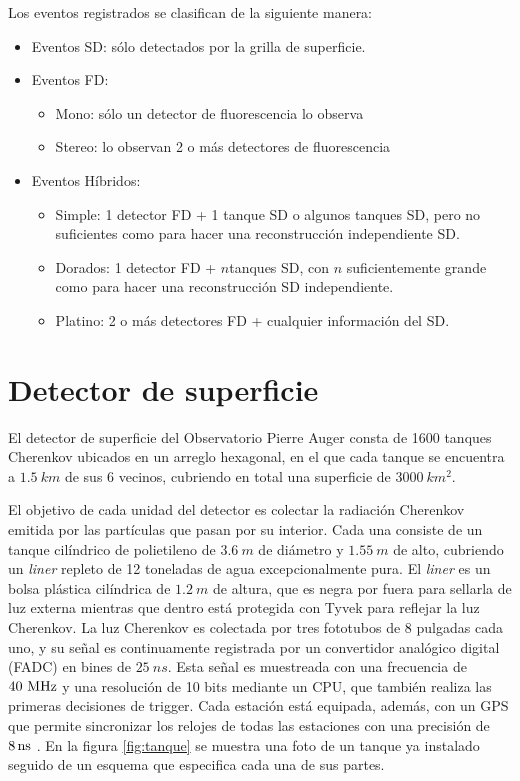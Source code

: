 	Los eventos registrados se clasifican de la siguiente manera:
	\begin{itemize}
		\item Eventos SD: s\'olo detectados por la grilla de superficie.
		\item Eventos FD:
		\begin{itemize}
			\item Mono: s\'olo un detector de fluorescencia lo observa
			\item Stereo: lo observan 2 o m\'as detectores de fluorescencia 
		\end{itemize} 
		\item Eventos H\'ibridos:
		\begin{itemize}
			\item Simple: 1 detector FD + 1 tanque SD o algunos tanques SD, pero no suficientes como para hacer una reconstrucci\'on independiente SD.
			\item Dorados: 1 detector FD + $n$tanques SD, con $n$ suficientemente grande como para hacer una reconstrucci\'on SD independiente.
			\item Platino: 2 o m\'as detectores FD + cualquier informaci\'on del SD.
		\end{itemize}
	\end{itemize}
	
	\section{Detector de superficie}
	
	El detector de superficie del Observatorio Pierre Auger consta de 1600 tanques Cherenkov ubicados en un arreglo hexagonal, en el que cada tanque se encuentra a $1.5\ km$ de sus 6 vecinos, cubriendo en total una superficie de $3000\ km^2$.
	
	El objetivo de cada unidad del detector es colectar la radiaci\'on Cherenkov emitida por las part\'iculas que pasan por su interior.
	Cada una consiste de un tanque cil\'indrico de polietileno de $3.6\ m$ de di\'ametro y $1.55\ m$ de alto, cubriendo un {\em liner} repleto de 12 toneladas de agua excepcionalmente pura. 
	El {\em liner} es un bolsa pl\'astica cil\'indrica de $1.2\ m$ de altura, que es negra por fuera para sellarla de luz externa mientras que dentro est\'a protegida con Tyvek para reflejar la luz Cherenkov. 
	La luz Cherenkov es colectada por tres fototubos de 8 pulgadas cada uno, y su señal es continuamente registrada por un convertidor anal\'ogico digital (FADC) en bines de $25\ ns$.
	Esta se\~nal es muestreada con una frecuencia de $40\rm \ MHz$ y una resoluci\'on de 10 bits mediante un CPU, que tambi\'en realiza las primeras decisiones de trigger.
	Cada estaci\'on est\'a equipada, adem\'as, con un GPS que permite sincronizar los relojes de todas las estaciones con una precisi\'on de $8\rm \,ns$ \cite{auger_prop04}.
	En la figura \ref{fig:tanque} se muestra una foto de un tanque ya instalado seguido de un esquema que especifica cada una de sus partes.
	

